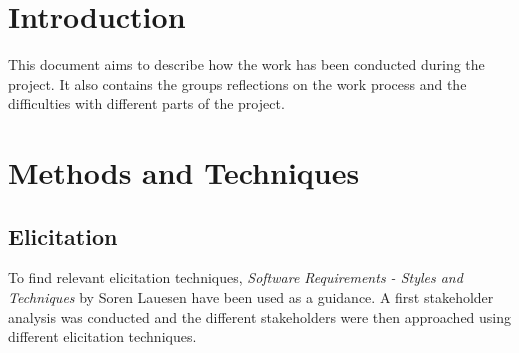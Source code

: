 \documentclass[10pt,a4paper]{article}
\begin{document}
\section{Introduction}
This document aims to describe how the work has been conducted during the project. It also contains the groups reflections on the work process and the difficulties with different parts of the project. 


\section{Methods and Techniques}




\subsection{Elicitation}
To find relevant elicitation techniques, \textit{Software Requirements - Styles and Techniques} by Soren Lauesen have been used as a guidance\cite{soren}. A first stakeholder analysis was conducted and the different stakeholders were then approached using different elicitation techniques. 
\end{document}

